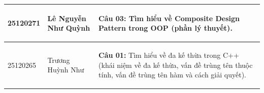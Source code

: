 \begin{table}[htbp]
\begin{tabularx}{\linewidth}{|C{2.2cm}|C{4.5cm}|X|}
        25120271 & 
        Lê Nguyễn Như Quỳnh & 
        \begin{tabitemize}
            \item \textbf{Câu 03:} Tìm hiểu về Composite Design Pattern trong OOP (phần lý thuyết).
        \end{tabitemize} \\
        \hline
        
        25120265 & 
        Trương Huỳnh Như & 
        \begin{tabitemize}
            \item \textbf{Câu 01:} Tìm hiểu về đa kế thừa trong C++ (khái niệm về đa kế thừa, vấn đề trùng tên thuộc tính, vấn đề trùng tên hàm và cách giải quyết).
        \end{tabitemize} \\
        \hline
    \end{tabularx}
\end{table}